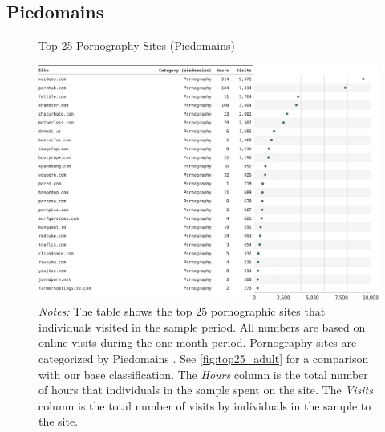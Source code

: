 \documentclass[12pt, letterpaper]{article}
\begin{document}
\subsection{Piedomains}
\begin{figure}[ht]
	\centering
	\caption{Top 25 Pornography Sites (Piedomains)}
	\includegraphics[width=\textwidth]{figs/top_25_adultsites_piedomains.pdf}
	\caption*{\footnotesize \emph{Notes:} 
		The table shows the top 25 pornographic sites that individuals visited in the sample period.
            All numbers are based on online visits during the one-month period.
		Pornography sites are categorized by Piedomains \citep{Chintalapati_piedomains_Predict_the_2022}.
            See \cref{fig:top25_adult} for a comparison with our base classification.
    	The \emph{Hours} column is the total number of hours that individuals in the sample spent on the site. 
    	The \emph{Visits} column is the total number of visits by individuals in the sample to the site.            
	}
	\label{fig:top25_adult_piedomains}
\end{figure}
\end{document}
